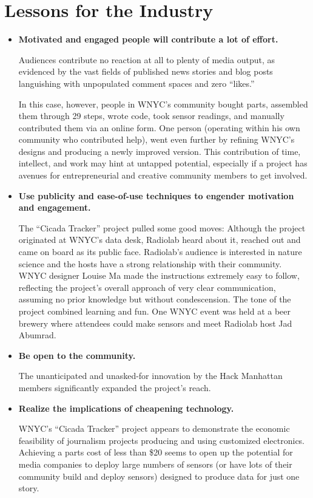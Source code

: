 \section{Lessons for the Industry}
\begin{itemize}
\item \textbf{Motivated and engaged people will contribute a lot of effort.}

Audiences contribute no reaction at all to plenty of media output,
as evidenced by the vast fields of published news stories and blog
posts languishing with unpopulated comment spaces and zero ``likes.''

In this case, however, people in WNYC's community bought parts,
assembled them through 29 steps, wrote code, took sensor readings,
and manually contributed them via an online form. One person (operating
within his own community who contributed help), went even
further by refining WNYC's designs and producing a newly improved
version. This contribution of time, intellect, and work may hint at
untapped potential, especially if a project has avenues for entrepreneurial
and creative community members to get involved.
\item \textbf{Use publicity and ease-of-use techniques to engender
motivation and engagement.}

The ``Cicada Tracker'' project pulled some good moves: Although
the project originated at WNYC's data desk, Radiolab heard about
it, reached out and came on board as its public face. Radiolab's audience
is interested in nature science and the hosts have a strong relationship
with their community. WNYC designer Louise Ma made the
instructions extremely easy to follow, reflecting the project's overall
approach of very clear communication, assuming no prior knowledge
but without condescension. The tone of the project combined
learning and fun. One WNYC event was held at a beer brewery where
attendees could make sensors and meet Radiolab host Jad Abumrad.
\item \textbf{Be open to the community.}

The unanticipated and unasked-for innovation by the Hack Manhattan
members significantly expanded the project's reach.
\item \textbf{Realize the implications of cheapening technology.}

WNYC's ``Cicada Tracker'' project appears to demonstrate the economic
feasibility of journalism projects producing and using customized
electronics. Achieving a parts cost of less than \$20 seems to
open up the potential for media companies to deploy large numbers
of sensors (or have lots of their community build and deploy sensors)
designed to produce data for just one story.


\end{itemize}
